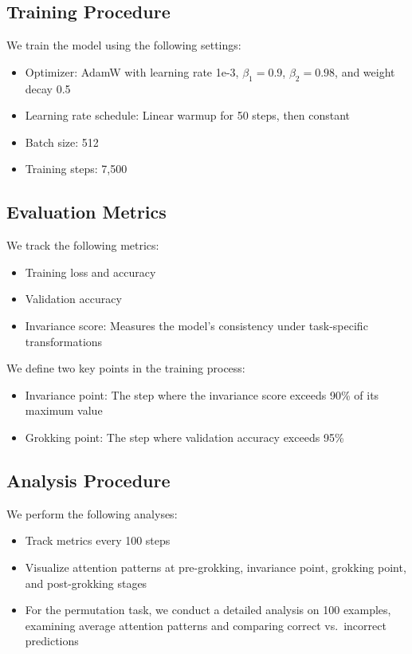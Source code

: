 \documentclass{article} %
\begin{document}
\subsection{Training Procedure}
We train the model using the following settings:
\begin{itemize}
    \item Optimizer: AdamW with learning rate 1e-3, $\beta_1=0.9$, $\beta_2=0.98$, and weight decay 0.5
    \item Learning rate schedule: Linear warmup for 50 steps, then constant
    \item Batch size: 512
    \item Training steps: 7,500
\end{itemize}

\subsection{Evaluation Metrics}
We track the following metrics:
\begin{itemize}
    \item Training loss and accuracy
    \item Validation accuracy
    \item Invariance score: Measures the model's consistency under task-specific transformations
\end{itemize}

We define two key points in the training process:
\begin{itemize}
    \item Invariance point: The step where the invariance score exceeds 90\% of its maximum value
    \item Grokking point: The step where validation accuracy exceeds 95\%
\end{itemize}

\subsection{Analysis Procedure}
We perform the following analyses:
\begin{itemize}
    \item Track metrics every 100 steps
    \item Visualize attention patterns at pre-grokking, invariance point, grokking point, and post-grokking stages
    \item For the permutation task, we conduct a detailed analysis on 100 examples, examining average attention patterns and comparing correct vs.\ incorrect predictions
\end{itemize}
\end{document}
